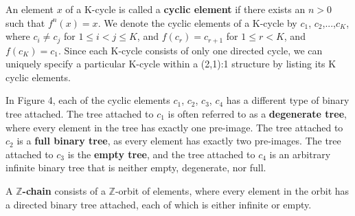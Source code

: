 \documentclass[12pt]{article}
\begin{document}
\begin{center}
\end{center}

An element $x$ of a K-cycle is called a \textbf{cyclic element} if there exists an $n>0$ such that $f^n(x)=x$. We denote the cyclic elements of a K-cycle by $c_1$, $c_2$,...,$c_K$, where $c_i \not= c_j$ for $1 \leq i < j \leq K$, and $f(c_r)=c_{r+1}$ for $1 \leq r < K$, and $f(c_K)=c_1$. Since each K-cycle consists of only one directed cycle, we can uniquely specify a particular K-cycle within a (2,1):1 structure by listing its K cyclic elements.

In Figure 4, each of the cyclic elements $c_1$, $c_2$, $c_3$, $c_4$ has a different type of binary tree attached. The tree attached to $c_1$ is often referred to as a \textbf{degenerate tree}, where every element in the tree has exactly one pre-image. The tree attached to $c_2$ is a \textbf{full binary tree}, as every element has exactly two pre-images. The tree attached to $c_3$ is the \textbf{empty tree}, and the tree attached to $c_4$ is an arbitrary infinite binary tree that is neither empty, degenerate, nor full.\\

\large
{}

\normalsize
A \textbf{$\mathbb{Z}$-chain} consists of a $\mathbb{Z}$-orbit of elements, where every element in the orbit has a directed binary tree attached, each of which is either infinite or empty. 
\end{document}

